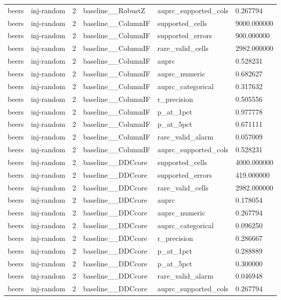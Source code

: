 \begin{tabular}{llllll}
beers & inj-random & 2 & baseline\_\_RobustZ & auprc\_supported\_cols & 0.267794 \\
beers & inj-random & 2 & baseline\_\_ColumnIF & supported\_cells & 9000.000000 \\
beers & inj-random & 2 & baseline\_\_ColumnIF & supported\_errors & 900.000000 \\
beers & inj-random & 2 & baseline\_\_ColumnIF & rare\_valid\_cells & 2982.000000 \\
beers & inj-random & 2 & baseline\_\_ColumnIF & auprc & 0.528231 \\
beers & inj-random & 2 & baseline\_\_ColumnIF & auprc\_numeric & 0.682627 \\
beers & inj-random & 2 & baseline\_\_ColumnIF & auprc\_categorical & 0.317632 \\
beers & inj-random & 2 & baseline\_\_ColumnIF & r\_precision & 0.505556 \\
beers & inj-random & 2 & baseline\_\_ColumnIF & p\_at\_1pct & 0.977778 \\
beers & inj-random & 2 & baseline\_\_ColumnIF & p\_at\_5pct & 0.671111 \\
beers & inj-random & 2 & baseline\_\_ColumnIF & rare\_valid\_alarm & 0.057009 \\
beers & inj-random & 2 & baseline\_\_ColumnIF & auprc\_supported\_cols & 0.528231 \\
beers & inj-random & 2 & baseline\_\_DDCcore & supported\_cells & 4000.000000 \\
beers & inj-random & 2 & baseline\_\_DDCcore & supported\_errors & 419.000000 \\
beers & inj-random & 2 & baseline\_\_DDCcore & rare\_valid\_cells & 2982.000000 \\
beers & inj-random & 2 & baseline\_\_DDCcore & auprc & 0.178054 \\
beers & inj-random & 2 & baseline\_\_DDCcore & auprc\_numeric & 0.267794 \\
beers & inj-random & 2 & baseline\_\_DDCcore & auprc\_categorical & 0.096250 \\
beers & inj-random & 2 & baseline\_\_DDCcore & r\_precision & 0.286667 \\
beers & inj-random & 2 & baseline\_\_DDCcore & p\_at\_1pct & 0.288889 \\
beers & inj-random & 2 & baseline\_\_DDCcore & p\_at\_5pct & 0.300000 \\
beers & inj-random & 2 & baseline\_\_DDCcore & rare\_valid\_alarm & 0.046948 \\
beers & inj-random & 2 & baseline\_\_DDCcore & auprc\_supported\_cols & 0.267794 \\

\end{tabular}
